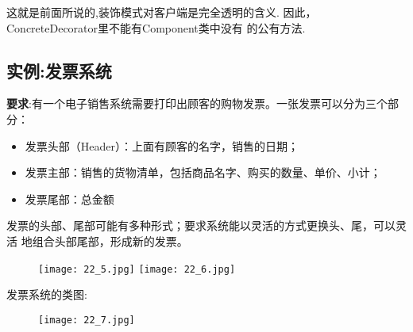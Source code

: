 \documentclass[../main.tex]{subfiles}
\begin{document}
\noindent 这就是前面所说的,装饰模式对客户端是完全透明的含义.
因此， ConcreteDecorator里不能有Component类中没有
的公有方法.
%
\subsection{实例:发票系统}
\textbf{要求}:有一个电子销售系统需要打印出顾客的购物发票。一张发票可以分为三个部分：
%
\begin{itemize}
  \item 发票头部（Header）：上面有顾客的名字，销售的日期；
  \item 发票主部：销售的货物清单，包括商品名字、购买的数量、单价、小计；
  \item 发票尾部：总金额
\end{itemize}
%
发票的头部、尾部可能有多种形式；要求系统能以灵活的方式更换头、尾，可以灵活
地组合头部尾部，形成新的发票。
%
\begin{figure}[H]
  \texttt{[image: 22\_5.jpg]}
  \texttt{[image: 22\_6.jpg]}
\end{figure}
%
发票系统的类图:
%
\begin{figure}[H]
  \texttt{[image: 22\_7.jpg]}
\end{figure}
%






\end{document}
